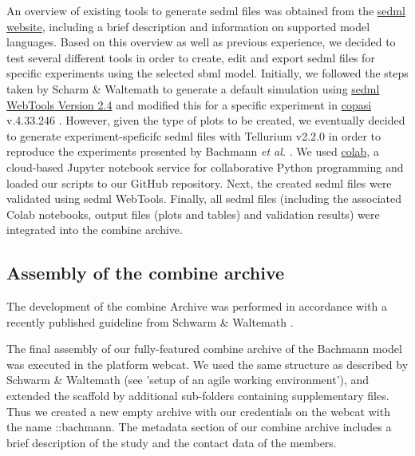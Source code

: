 An overview of existing tools to generate \ac{sedml} files was obtained from the \hyperlink{http://sed-ml.org/}{\acs{sedml} website}, including a brief description and information on supported model languages. Based on this overview as well as previous experience, we decided to test several different tools in order to create, edit and export \ac{sedml} files for specific experiments using the selected \ac{sbml} model. 
Initially, we followed the steps taken by Scharm \& Waltemath \cite{combine} to generate a default simulation using \hyperlink{http://sysbioapps.spdns.org/SED-ML_Web_Tools}{\acs{sedml} WebTools Version 2.4} and modified this for a specific experiment in \hyperlink{http://copasi.org/}{\ac{copasi}} v.4.33.246 \cite{copasi}. However, given the type of plots to be created, we eventually decided to generate experiment-speficifc \ac{sedml} files with Tellurium v2.2.0 \cite{tellurium} in order to reproduce the experiments presented by Bachmann \textit{et al.} \cite{bachmannmodel}. We used \hyperlink{https://colab.research.google.com/notebooks/welcome.ipynb}{\ac{colab}}, a cloud-based Jupyter notebook service for collaborative Python programming and loaded our scripts to our GitHub repository. Next, the created \ac{sedml} files were validated using \ac{sedml} WebTools. Finally, all \ac{sedml} files (including the associated Colab notebooks, output files (plots and tables) and validation results) were integrated into the \ac{combine} archive.

\subsection*{Assembly of the \acs{combine} archive}

The development of the \ac{combine} Archive was performed in accordance with a recently published guideline from Schwarm \& Waltemath \cite{combine}.

The final assembly of our fully-featured \ac{combine} archive of the Bachmann model was executed in the platform \ac{webcat}. We used the same structure as described by Schwarm \& Waltemath (see 'setup of an agile working environment'), and extended the scaffold by additional sub-folders containing supplementary files. Thus we created a new empty archive with our credentials on the \ac{webcat} with the name \textsf{::bachmann}. The metadata section of our \ac{combine} archive includes a brief description of the study and the contact data of the members.

